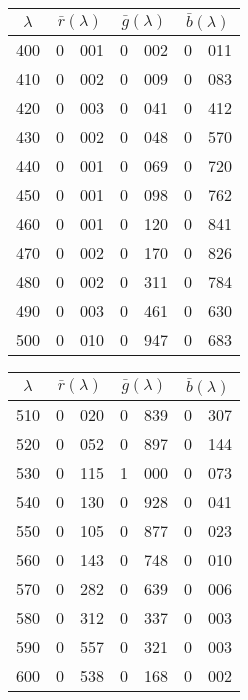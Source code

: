 {
\small
{
\noindent\resizebox{\linewidth}{!}{}\\
\setlength{\tabcolsep}{.35em}
\begin{minipage}{.3\textwidth}
\centering
\begin{tabular}{c|r@{.}l | r@{.}l | r@{.}l}
$\lambda$ & \multicolumn{2}{c|}{$\bar r(\lambda)$} &  \multicolumn{2}{c|}{$\bar g(\lambda)$} &  \multicolumn{2}{c}{$\bar b(\lambda)$} \\
\hline
 400 &   0&001 &   0&002 &   0&011 \\
 410 &   0&002 &   0&009 &   0&083 \\
 420 &   0&003 &   0&041 &   0&412 \\
 430 &   0&002 &   0&048 &   0&570 \\
 440 &   0&001 &   0&069 &   0&720 \\
 450 &   0&001 &   0&098 &   0&762 \\
 460 &   0&001 &   0&120 &   0&841 \\
 470 &   0&002 &   0&170 &   0&826 \\
 480 &   0&002 &   0&311 &   0&784 \\
 490 &   0&003 &   0&461 &   0&630 \\
 500 &   0&010 &   0&947 &   0&683 \\
\end{tabular}
\end{minipage}\hfill
\begin{minipage}{.3\textwidth}
\centering
\begin{tabular}{c|r@{.}l | r@{.}l | r@{.}l}
$\lambda$ & \multicolumn{2}{c|}{$\bar r(\lambda)$} &  \multicolumn{2}{c|}{$\bar g(\lambda)$} &  \multicolumn{2}{c}{$\bar b(\lambda)$} \\
\hline
 510 &   0&020 &   0&839 &   0&307 \\
 520 &   0&052 &   0&897 &   0&144 \\
 530 &   0&115 &   1&000 &   0&073 \\
 540 &   0&130 &   0&928 &   0&041 \\
 550 &   0&105 &   0&877 &   0&023 \\
 560 &   0&143 &   0&748 &   0&010 \\
 570 &   0&282 &   0&639 &   0&006 \\
 580 &   0&312 &   0&337 &   0&003 \\
 590 &   0&557 &   0&321 &   0&003 \\
 600 &   0&538 &   0&168 &   0&002 \\

\end{tabular}
\end{minipage}}}
